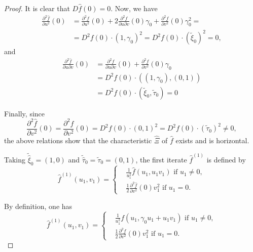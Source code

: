 \begin{proof}
It is clear that $D\hat{f}(0) = 0$. Now, we have
\begin{align*}
\frac{\partial^{2} \hat{f}}{\partial u^{2}} (0) & = \frac{\partial^{2}
f}{\partial u^{2}} (0) + 2\frac{\partial^{2} f}{\partial u \partial
  v}(0) \gamma_{0} + \frac{\partial^{2} f}{\partial v^{2}} (0)
\gamma_{0}^{2} = \\
& = D^{2}f(0) \cdot (1, \gamma_{0})^{2} = D^{2}f(0) \cdot
(\widetilde{\xi}_{0})^{2} = 0,
\end{align*}
and 
\begin{align*}
\frac{\partial^{2}\hat{f}}{\partial u \partial v} (0) &=
\frac{\partial^{2} f}{\partial u \partial v} (0) +
\frac{\partial^{2}f}{\partial v^{2}}(0) \gamma_{0}\\ 
&= D^{2}f(0) \cdot ((1, \gamma_{0}), (0, 1))\\ 
&= D^{2}f(0) \cdot (\widetilde{\xi}_{0}, \widetilde{\tau}_{0}) = 0
\end{align*}

Finally, since
\begin{equation*}
\frac{\partial^{2} \hat{f}}{\partial v^{2}}(0) = \frac{\partial^{2}
  f}{\partial v^{2}}(0) = D^{2}f(0) \cdot (0, 1)^{2} = D^{2}f(0) \cdot
(\widetilde{\tau}_{0})^{2} \neq 0,\tag{8.7}\label{chap5-eq8.7}
\end{equation*}
the above relations show that the characteristic $\hat{\Xi}$ of
$\hat{f}$ exists and is horizontal.

Taking $\widetilde{\hat{\xi}}_{0} = (1, 0)$ and
$\widetilde{\hat{\tau}}_{0} = \widetilde{\tau}_{0} = (0, 1)$, the
first iterate $\hat{f}^{(1)}$ is defined by
\begin{equation*}
\hat{f}^{(1)} (u_{1}, v_{1}) = 
\begin{cases}
& \frac{1}{u_{1}^{2}} \hat{f}(u_{1}, u_{1} v_{1}) \text{ if } u_{1}
  \neq 0,\\
& \frac{1}{2} \frac{\partial^{2} \hat{f}}{\partial v^{2}}(0) v_{1}^{2}
  \text{ if } u_{1} = 0.
\end{cases}\tag{8.8}\label{chap5-eq8.8}
\end{equation*}

By definition, one has
\begin{equation*}
\hat{f}^{(1)} (u_{1}, v_{1}) = 
\begin{cases}
& \frac{1}{u_{1}^{2}} f(u_{1}, \gamma_{0}u_{1}+ u_{1}v_{1}) \text{ if } u_{1}
  \neq 0,\\
& \frac{1}{2} \frac{\partial^{2} f}{\partial v^{2}}(0) v_{1}^{2}
  \text{ if } u_{1} = 0.
\end{cases}\tag{8.9}\label{chap5-eq8.9}
\end{equation*}


\end{proof}
